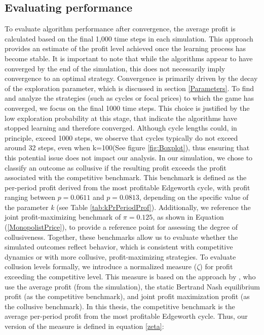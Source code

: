 \documentclass{article}
\begin{document}
\subsection{Evaluating performance}
To evaluate algorithm performance after convergence, the average profit is calculated based on the final 1,000 time steps in each simulation. This approach provides an estimate of the profit level achieved once the learning process has become stable. It is important to note that while the algorithms appear to have converged by the end of the simulation, this does not necessarily imply convergence to an optimal strategy. Convergence is primarily driven by the decay of the exploration parameter, which is discussed in section \ref{Parameters}.
\newline
To find and analyze the strategies (such as cycles or focal prices) to which the game has converged, we focus on the final 1000 time steps. This choice is justified by the low exploration probability at this stage, that indicate the algorithms have stopped learning and therefore converged. Although cycle lengths could, in principle, exceed 1000 steps, we observe that cycles typically do not exceed around 32 steps, even when k=100(See figure \ref{fig:Boxplot}), thus ensuring that this potential issue does not impact our analysis.
\newline
In our simulation, we chose to classify an outcome as collusive if the resulting profit exceeds the profit associated with the competitive benchmark. This benchmark is defined as the per-period profit derived from the most profitable Edgeworth cycle, with profit ranging between $p = 0.0611$ and $p = 0.0813$, depending on the specific value of the parameter \textit{k} (see Table \ref{tab:kPrPeriodProf}). Additionally, we reference the joint profit-maximizing benchmark of $\pi = 0.125$, as shown in Equation (\ref{MonopolistPrice}), to provide a reference point for assessing the degree of collusiveness. Together, these benchmarks allow us to evaluate whether the simulated outcomes reflect behavior, which is consistent with competitive dynamics or with more collusive, profit-maximizing strategies.
\newline
To evaluate collusion levels formally, we introduce a normalized measure (\(\zeta\)) for profit exceeding the competitive level. This measure is based on the approach by \cite{Calvano}, who use the average profit (from the simulation), the static Bertrand Nash equilibrium profit (as the competitive benchmark), and joint profit maximization profit (as the collusive benchmark). In this thesis, the competitive benchmark is the average per-period profit from the most profitable Edgeworth cycle. Thus, our version of the measure is defined in equation \ref{zeta}:
\end{document}
